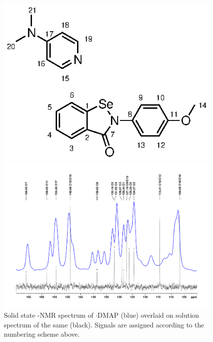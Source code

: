 \begin{refsection}
\begin{figure}
    \centering
    \includegraphics[scale=0.74]{Figures/numbering.eps}

    \includegraphics[width=\linewidth]{Figures/ebs-4ome-dmap-cpmas-sol-13c.pdf}
    \caption[Solid state -NMR spectrum of $\cdot$DMAP.]{Solid state -NMR spectrum of $\cdot$DMAP (blue) overlaid on solution spectrum of the same (black). Signals are assigned according to the numbering scheme above.}
    \label{fig:cpmas-sol-13c}
\end{figure}


\end{refsection}
